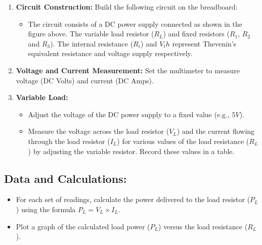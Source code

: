 \begin{enumerate}
    \item \textbf{Circuit Construction:} Build the following circuit on the breadboard:

    \begin{figure}
        \centering
        
        \label{fig:thevenin_6}
    \end{figure}

    \begin{itemize}
        \item The circuit consists of a DC power supply connected as shown in the figure above. The variable load resistor ($R_L$) and fixed resistors ($R_1$, $R_2$ and $R_3$). The internal resistance ($R_i$) and $V_th$ represent Thevenin’s equivalent resistance and voltage supply respectively.
    \end{itemize}

    \item \textbf{Voltage and Current Measurement:} Set the multimeter to measure voltage (DC Volts) and current (DC Amps).

    \item \textbf{Variable Load:}

    \begin{itemize}
        \item Adjust the voltage of the DC power supply to a fixed value (e.g., $5V$).
        \item Measure the voltage across the load resistor ($V_L$) and the current flowing through the load resistor ($I_L$) for various values of the load resistance ($R_L$) by adjusting the variable resistor. Record these values in a table.
    \end{itemize}

\end{enumerate}

\subsection*{Data and Calculations:}
\begin{itemize}
    \item For each set of readings, calculate the power delivered to the load resistor ($P_L$) using the formula $P_L = V_L \times I_L$.
    \item Plot a graph of the calculated load power ($P_L$) versus the load resistance ($R_L$).
\end{itemize}

